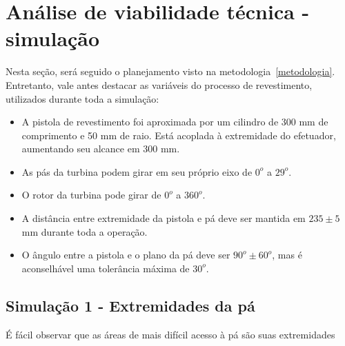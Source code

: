 \section{Análise de viabilidade técnica - simulação}

Nesta seção, será seguido o planejamento visto na metodologia~\ref{metodologia}.
Entretanto, vale antes destacar as variáveis do processo de revestimento,
utilizados durante toda a simulação:

\begin{itemize}
  \item A pistola de revestimento foi aproximada por um cilindro de 300 mm de
  comprimento e 50 mm de raio. Está acoplada à extremidade do efetuador,
  aumentando seu alcance em 300 mm.
  \item As pás da turbina podem girar em seu próprio eixo de $0^o$ a $29^o$.
  \item O rotor da turbina pode girar de $0^o$ a $360^o$.
  \item A distância entre extremidade da pistola e pá deve ser mantida em $235
  \pm 5$ mm durante toda a operação.
  \item O ângulo entre a pistola e o plano da pá deve ser $90^o \pm 60^o$, mas
  é aconselhável uma tolerância máxima de $30^o$.
\end{itemize}

\subsection{Simulação 1 - Extremidades da pá}

É fácil observar que as áreas de mais difícil acesso à pá são suas extremidades 